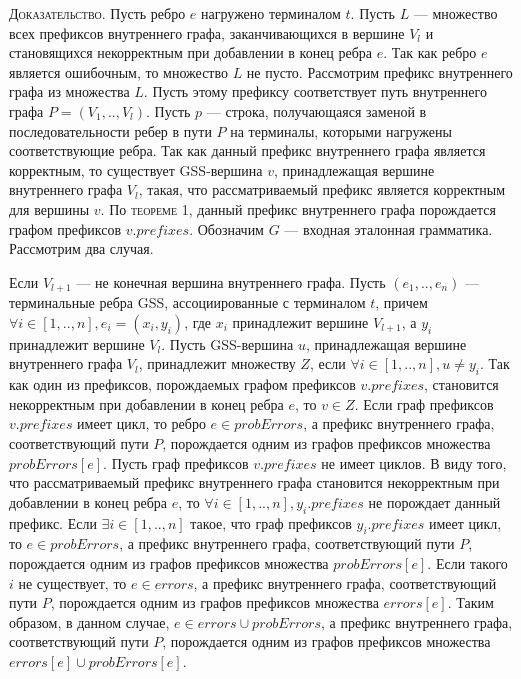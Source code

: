 \textsc{Доказательство.}
Пусть ребро $e$ нагружено терминалом $t$. Пусть $L$ --- множество всех префиксов внутреннего графа, заканчивающихся в вершине $V_{l}$ и становящихся некорректным при добавлении в конец ребра $e$. Так как ребро $e$ является ошибочным, то множество $L$ не пусто. Рассмотрим префикс внутреннего графа из множества $L$. Пусть этому префиксу соответствует путь внутреннего графа $P = (V_{1},..,V_{l})$. Пусть $p$ --- строка, получающаяся заменой в последовательности ребер в пути $P$ на терминалы, которыми нагружены соответствующие ребра. Так как данный префикс внутреннего графа является корректным, то существует GSS-вершина $v$, принадлежащая вершине внутреннего графа $V_{l}$, такая, что рассматриваемый префикс является корректным для вершины $v$. По \textsc{теореме 1}, данный префикс внутреннего графа порождается графом префиксов $v.prefixes$. Обозначим $G$ --- входная эталонная грамматика. Рассмотрим два случая.

Если $V_{l+1}$ --- не конечная вершина внутреннего графа. Пусть $(e_{1},..,e_{n})$ --- терминальные ребра GSS, ассоциированные с терминалом $t$, причем $\forall i \in [1,..,n], e_{i} = (x_{i},y_{i})$, где $x_{i}$ принадлежит вершине $V_{l+1}$, а $y_{i}$ принадлежит вершине $V_{l}$. Пусть GSS-вершина $u$, принадлежащая вершине внутреннего графа $V_{l}$, принадлежит множеству $Z$, если $\forall i \in [1,..,n], u \neq y_{i}$. Так как один из префиксов, порождаемых графом префиксов $v.prefixes$, становится некорректным при добавлении в конец ребра $e$, то $v \in Z$. Если граф префиксов $v.prefixes$ имеет цикл, то ребро $e \in probErrors$, а префикс внутреннего графа, соответствующий пути $P$, порождается одним из графов префиксов множества $probErrors[e]$. Пусть граф префиксов $v.prefixes$ не имеет циклов. В виду того, что рассматриваемый префикс внутреннего графа становится некорректным при добавлении в конец ребра $e$, то $\forall i \in [1,..,n], y_{i}.prefixes$ не порождает данный префикс. Если $\exists i \in [1,..,n]$ такое, что граф префиксов $y_{i}.prefixes$ имеет цикл, то $e \in probErrors$, а префикс внутреннего графа, соответствующий пути $P$, порождается одним из графов префиксов множества $probErrors[e]$. Если такого $i$ не существует, то $e \in errors$, а префикс внутреннего графа, соответствующий пути $P$, порождается одним из графов префиксов множества $errors[e]$. Таким образом, в данном случае,  $e \in errors \cup probErrors$, а префикс внутреннего графа, соответствующий пути $P$, порождается одним из графов префиксов множества $errors[e] \cup probErrors[e]$.

